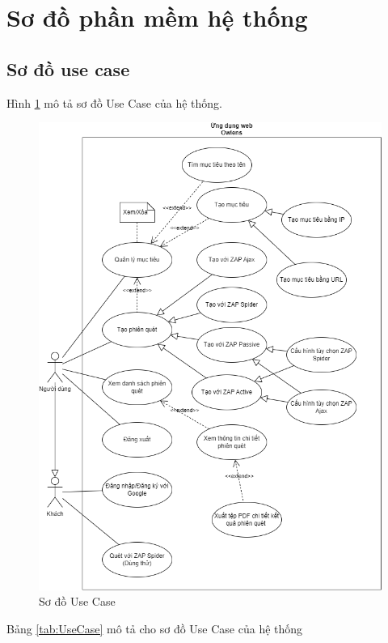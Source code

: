 \section{Sơ đồ phần mềm hệ thống}

\subsection{Sơ đồ use case}

\tab Hình \ref{fig:UseCase} mô tả sơ đồ Use Case của hệ thống.

\begin{figure}[H]
      \centering
      \includegraphics[width=\textwidth]{applied-thesis-chapters/chapter-3/Sơ đồ Use Case.png}
      \caption{Sơ đồ Use Case}
      \label{fig:UseCase}
\end{figure}

Bảng \ref{tab:UseCase} mô tả cho sơ đồ Use Case của hệ thống

